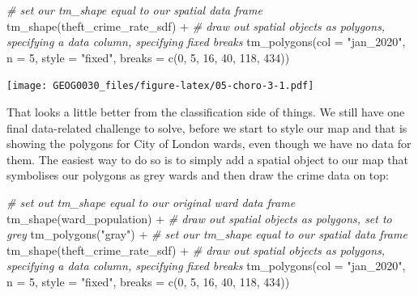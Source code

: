 \documentclass[
]{book}
\newenvironment{Shaded}{\begin{snugshade}}{\end{snugshade}}
\newcommand{\AttributeTok}[1]{\textcolor[rgb]{0.77,0.63,0.00}{#1}}
\newcommand{\CommentTok}[1]{\textcolor[rgb]{0.56,0.35,0.01}{\textit{#1}}}
\newcommand{\DecValTok}[1]{\textcolor[rgb]{0.00,0.00,0.81}{#1}}
\newcommand{\FunctionTok}[1]{\textcolor[rgb]{0.00,0.00,0.00}{#1}}
\newcommand{\NormalTok}[1]{#1}
\newcommand{\SpecialCharTok}[1]{\textcolor[rgb]{0.00,0.00,0.00}{#1}}
\newcommand{\StringTok}[1]{\textcolor[rgb]{0.31,0.60,0.02}{#1}}
\begin{document}
\begin{Shaded}
\begin{Highlighting}[]
\CommentTok{\# set our tm\_shape equal to our spatial data frame}
\FunctionTok{tm\_shape}\NormalTok{(theft\_crime\_rate\_sdf) }\SpecialCharTok{+}
  \CommentTok{\# draw out spatial objects as polygons, specifying a data column, specifying fixed breaks}
  \FunctionTok{tm\_polygons}\NormalTok{(}\AttributeTok{col =} \StringTok{"jan\_2020"}\NormalTok{, }\AttributeTok{n =} \DecValTok{5}\NormalTok{, }\AttributeTok{style =} \StringTok{"fixed"}\NormalTok{, }\AttributeTok{breaks =} \FunctionTok{c}\NormalTok{(}\DecValTok{0}\NormalTok{, }\DecValTok{5}\NormalTok{, }\DecValTok{16}\NormalTok{, }\DecValTok{40}\NormalTok{, }\DecValTok{118}\NormalTok{, }\DecValTok{434}\NormalTok{))}
\end{Highlighting}
\end{Shaded}

\texttt{[image: GEOG0030\_files/figure-latex/05-choro-3-1.pdf]}

That looks a little better from the classification side of things. We still have one final data-related challenge to solve, before we start to style our map and that is showing the polygons for City of London wards, even though we have no data for them. The easiest way to do so is to simply add a spatial object to our map that symbolises our polygons as grey wards and then draw the crime data on top:

\begin{Shaded}
\begin{Highlighting}[]
\CommentTok{\# set out tm\_shape equal to our original ward data frame}
\FunctionTok{tm\_shape}\NormalTok{(ward\_population) }\SpecialCharTok{+}
  \CommentTok{\# draw out spatial objects as polygons, set to grey}
  \FunctionTok{tm\_polygons}\NormalTok{(}\StringTok{"gray"}\NormalTok{) }\SpecialCharTok{+}
  \CommentTok{\# set our tm\_shape equal to our spatial data frame}
  \FunctionTok{tm\_shape}\NormalTok{(theft\_crime\_rate\_sdf) }\SpecialCharTok{+}
  \CommentTok{\# draw out spatial objects as polygons, specifying a data column, specifying fixed breaks}
  \FunctionTok{tm\_polygons}\NormalTok{(}\AttributeTok{col =} \StringTok{"jan\_2020"}\NormalTok{, }\AttributeTok{n =} \DecValTok{5}\NormalTok{, }\AttributeTok{style =} \StringTok{"fixed"}\NormalTok{, }\AttributeTok{breaks =} \FunctionTok{c}\NormalTok{(}\DecValTok{0}\NormalTok{, }\DecValTok{5}\NormalTok{, }\DecValTok{16}\NormalTok{, }\DecValTok{40}\NormalTok{, }\DecValTok{118}\NormalTok{, }\DecValTok{434}\NormalTok{))}
\end{Highlighting}
\end{Shaded}
\end{document}
